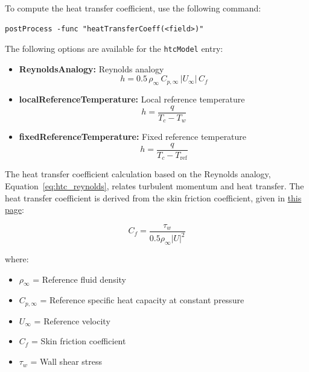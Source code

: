 \documentclass[12pt]{article}
\begin{document}
To compute the heat transfer coefficient, use the following command:
%
\begin{lstlisting}
postProcess -func "heatTransferCoeff(<field>)"
\end{lstlisting}

The following options are available for the \texttt{htcModel} entry:
\begin{itemize}
    \item \textbf{ReynoldsAnalogy:} Reynolds analogy
    \begin{equation}
    h = 0.5 \, \rho_\infty \, C_{p,\infty} \, |U_\infty| \, C_f
    \label{eq:htc_reynolds}
    \end{equation}
    \item \textbf{localReferenceTemperature:} Local reference temperature
    \begin{equation}
    h = \frac{q}{T_c - T_w}
    \label{eq:htc_local}
    \end{equation}
    \item \textbf{fixedReferenceTemperature:} Fixed reference temperature
    \begin{equation}
    h = \frac{q}{T_c - T_{\text{ref}}}
    \label{eq:htc_fixed}
    \end{equation}
\end{itemize}

The heat transfer coefficient calculation based on the Reynolds analogy, Equation~\ref{eq:htc_reynolds}, relates turbulent momentum and heat transfer. The heat transfer coefficient is derived from the skin friction coefficient, given in \href{https://www.openfoam.com/documentation/guides/v2206/api/classFoam_1_1heatTransferCoeffModels_1_1ReynoldsAnalogy.html#details}{this page}:

\begin{equation}
C_f = \frac{\tau_w}{0.5 \rho_\infty |U|^2}
\label{eq:skin_coeff}
\end{equation}

where:
\begin{itemize}
    \item $\rho_\infty$ = Reference fluid density
    \item $C_{p,\infty}$ = Reference specific heat capacity at constant pressure
    \item $U_\infty$ = Reference velocity
    \item $C_f$ = Skin friction coefficient
    \item $\tau_w$ = Wall shear stress
\end{itemize}
\end{document}
